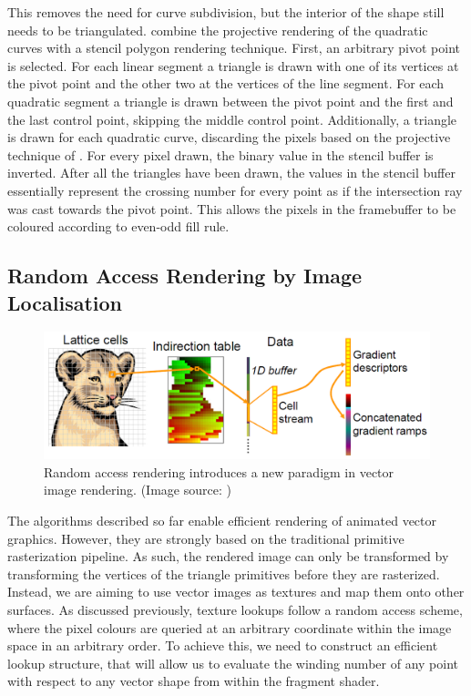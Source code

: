 \documentclass[11pt,a4paper,twoside]{article}
\begin{document}
This removes the need for curve subdivision, but the interior of the shape still needs to be triangulated. \cite{Kokojima06} combine the projective rendering of the quadratic curves with a stencil polygon rendering technique. First, an arbitrary pivot point is selected. For each linear segment a triangle is drawn with one of its vertices at the pivot point and the other two at the vertices of the line segment. For each quadratic segment a triangle is drawn between the pivot point and the first and the last control point, skipping the middle control point. Additionally, a triangle is drawn for each quadratic curve, discarding the pixels based on the projective technique of \cite{LoopBlinn05}. For every pixel drawn, the binary value in the stencil buffer is inverted. After all the triangles have been drawn, the values in the stencil buffer essentially represent the crossing number for every point as if the intersection ray was cast towards the pivot point. This allows the pixels in the framebuffer to be coloured according to even-odd fill rule.

\subsection {Random Access Rendering by Image Localisation}

\begin {figure}
	\centering
	\includegraphics [width=1.0\columnwidth] {figures/nehab_hoppe}
	\caption {Random access rendering introduces a new paradigm in vector image rendering. (Image source: \cite{NehabHoppe08}) }
	\label {fig:nehab_hoppe}
\end {figure}

The algorithms described so far enable efficient rendering of animated vector graphics. However, they are strongly based on the traditional primitive rasterization pipeline. As such, the rendered image can only be transformed by transforming the vertices of the triangle primitives before they are rasterized. Instead, we are aiming to use vector images as textures and map them onto other surfaces. As discussed previously, texture lookups follow a random access scheme, where the pixel colours are queried at an arbitrary coordinate within the image space in an arbitrary order. To achieve this, we need to construct an efficient lookup structure, that will allow us to evaluate the winding number of any point with respect to any vector shape from within the fragment shader.
\end{document}
